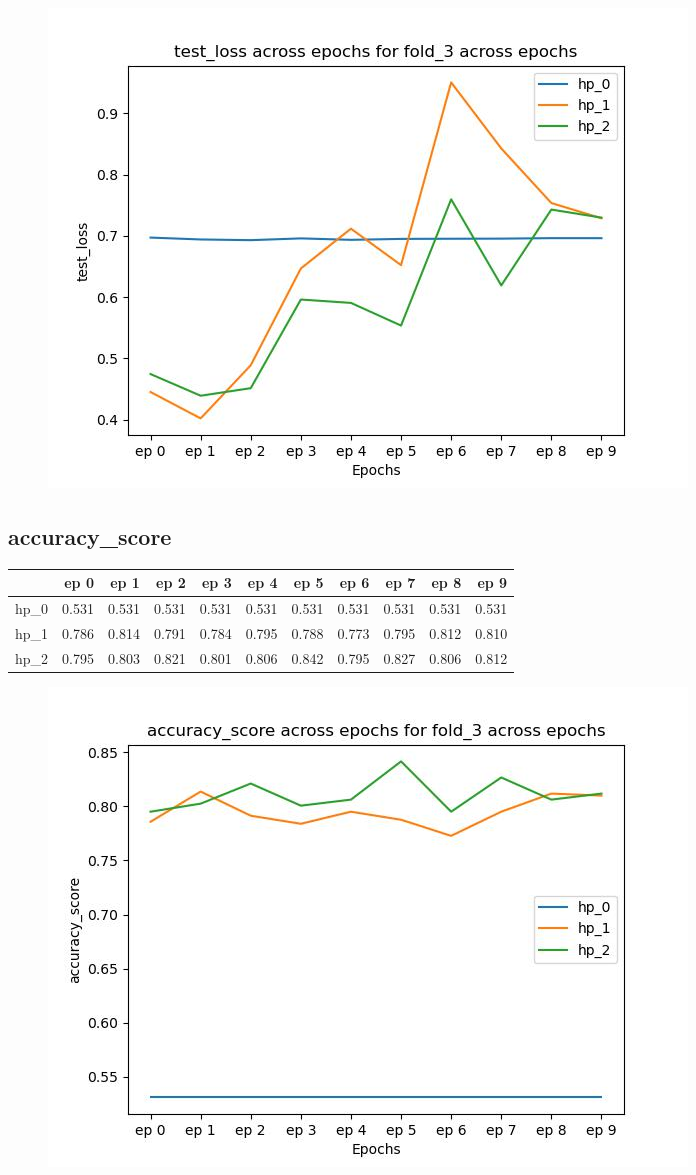 \documentclass{article}
\begin{document}
\begin{figure}[H]
\includegraphics[scale = 0.75]{fold_3/test_loss}
\end{figure}
\subsection{accuracy\_score}
\begin{tabular}{lrrrrrrrrrr}
\toprule
{} &   ep 0 &   ep 1 &   ep 2 &   ep 3 &   ep 4 &   ep 5 &   ep 6 &   ep 7 &   ep 8 &   ep 9 \\
\midrule
hp\_0 &  0.531 &  0.531 &  0.531 &  0.531 &  0.531 &  0.531 &  0.531 &  0.531 &  0.531 &  0.531 \\
hp\_1 &  0.786 &  0.814 &  0.791 &  0.784 &  0.795 &  0.788 &  0.773 &  0.795 &  0.812 &  0.810 \\
hp\_2 &  0.795 &  0.803 &  0.821 &  0.801 &  0.806 &  0.842 &  0.795 &  0.827 &  0.806 &  0.812 \\
\bottomrule
\end{tabular}

\begin{figure}[H]
\includegraphics[scale = 0.75]{fold_3/accuracy_score}
\end{figure}
\end{document}
